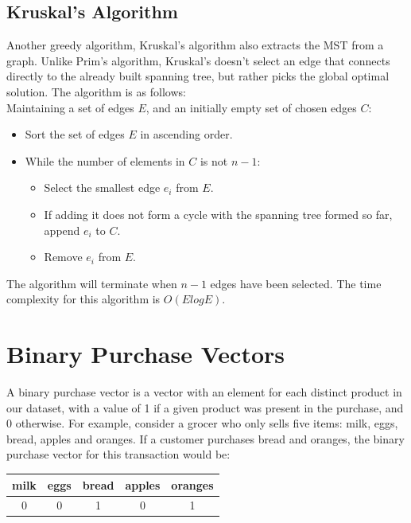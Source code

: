 \documentclass[paper=a4,fontsize=11pt]{report}	%
\begin{document}
\subsection{Kruskal's Algorithm}
Another greedy algorithm,  Kruskal's algorithm \cite{kruskal} also extracts the MST from a graph.  Unlike Prim's algorithm, Kruskal's doesn't select an edge that connects directly to the already built spanning tree, but rather picks the global optimal solution. The algorithm is as follows:\\
Maintaining a set of edges $E$, and an initially empty set of chosen edges $C$:
\begin{itemize}
\item Sort the set of edges $E$ in ascending order.
\item While the number of elements in $C$ is not $n-1$:
	\begin{itemize}
	\item Select the smallest edge $e_i$ from $E$.
	\item If adding it does not form a cycle with the spanning tree formed so far, append $e_i$ to $C$.
	\item Remove $e_i$ from $E$.
	\end{itemize}
\end{itemize}
The algorithm will terminate when $n-1$ edges have been selected.  The time complexity for this algorithm is $O(ElogE)$.

\section{Binary Purchase Vectors}
A binary purchase vector is a vector with an element for each distinct product in our dataset, with a value of 1 if a given product was present in the purchase, and 0 otherwise. For example, consider a grocer who only sells five items: milk, eggs, bread, apples and oranges. If a customer purchases bread and oranges, the binary purchase vector for this transaction would be:
\begin{table}[H]
\centering
\begin{tabular}{@{}ccccc@{}}
\toprule
milk & eggs & bread & apples & oranges \\ \midrule
0    & 0    & 1     & 0      & 1       \\ \bottomrule
\end{tabular}
\end{table}
\end{document}
